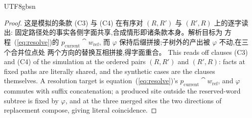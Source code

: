 \begin{CJK*}{UTF8}{gbsn}
\begin{proof}
\ifPaperChinese
  这是模拟的条款 (C3) 与 (C4) 在有序对 $(R, R')$ 与 $(R', R)$ 上的逐字读出:
  固定路径处的事实各侧字面共享,合成情形即诸条款本身。解析目标为
  方程~(\ref{eq:resolve})的 $p_{\mathrm{current}} \cat w_{\mathrm{ref}}$,
  而 $\varphi$ 保持后缀拼接;子树外的产出被 $\varphi$ 不动,在三个合并位点处
  两个方向的替换互相拼接,得字面重合。
\else
  This reads off clauses (C3) and (C4) of the simulation at the
  ordered pairs $(R, R')$ and $(R', R)$: facts at fixed paths are
  literally shared, and the synthetic cases are the clauses
  themselves. A resolution target is
  equation~(\ref{eq:resolve})'s
  $p_{\mathrm{current}} \cat w_{\mathrm{ref}}$, and $\varphi$
  commutes with suffix concatenation; a produced site outside the
  reserved-word subtree is fixed by $\varphi$, and at the three
  merged sites the two directions of replacement compose, giving
  literal coincidence.
\fi
\end{proof}


\end{CJK*}
